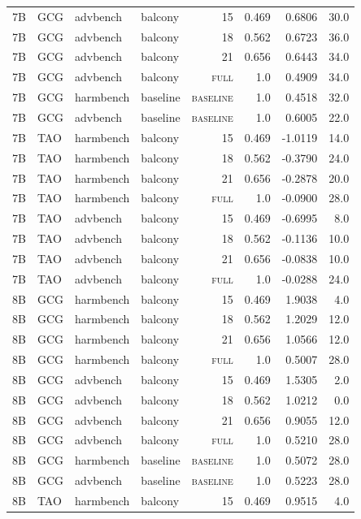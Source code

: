 \begin{tabular}{llllrrrr}
7B & GCG & advbench & balcony & 15 & 0.469 & 0.6806 & 30.0 \\
7B & GCG & advbench & balcony & 18 & 0.562 & 0.6723 & 36.0 \\
7B & GCG & advbench & balcony & 21 & 0.656 & 0.6443 & 34.0 \\
7B & GCG & advbench & balcony & \textsc{full} & 1.0 & 0.4909 & 34.0 \\
7B & GCG & harmbench & baseline & \textsc{baseline} & 1.0 & 0.4518 & 32.0 \\
7B & GCG & advbench & baseline & \textsc{baseline} & 1.0 & 0.6005 & 22.0 \\
7B & TAO & harmbench & balcony & 15 & 0.469 & -1.0119 & 14.0 \\
7B & TAO & harmbench & balcony & 18 & 0.562 & -0.3790 & 24.0 \\
7B & TAO & harmbench & balcony & 21 & 0.656 & -0.2878 & 20.0 \\
7B & TAO & harmbench & balcony & \textsc{full} & 1.0 & -0.0900 & 28.0 \\
7B & TAO & advbench & balcony & 15 & 0.469 & -0.6995 & 8.0 \\
7B & TAO & advbench & balcony & 18 & 0.562 & -0.1136 & 10.0 \\
7B & TAO & advbench & balcony & 21 & 0.656 & -0.0838 & 10.0 \\
7B & TAO & advbench & balcony & \textsc{full} & 1.0 & -0.0288 & 24.0 \\
8B & GCG & harmbench & balcony & 15 & 0.469 & 1.9038 & 4.0 \\
8B & GCG & harmbench & balcony & 18 & 0.562 & 1.2029 & 12.0 \\
8B & GCG & harmbench & balcony & 21 & 0.656 & 1.0566 & 12.0 \\
8B & GCG & harmbench & balcony & \textsc{full} & 1.0 & 0.5007 & 28.0 \\
8B & GCG & advbench & balcony & 15 & 0.469 & 1.5305 & 2.0 \\
8B & GCG & advbench & balcony & 18 & 0.562 & 1.0212 & 0.0 \\
8B & GCG & advbench & balcony & 21 & 0.656 & 0.9055 & 12.0 \\
8B & GCG & advbench & balcony & \textsc{full} & 1.0 & 0.5210 & 28.0 \\
8B & GCG & harmbench & baseline & \textsc{baseline} & 1.0 & 0.5072 & 28.0 \\
8B & GCG & advbench & baseline & \textsc{baseline} & 1.0 & 0.5223 & 28.0 \\
8B & TAO & harmbench & balcony & 15 & 0.469 & 0.9515 & 4.0 \\

\end{tabular}
